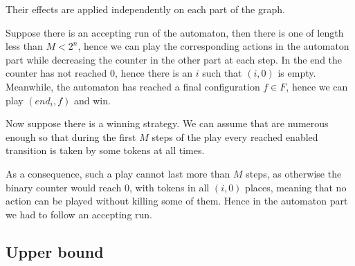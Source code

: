 \documentclass{article}
\begin{document}
Their effects are applied independently on each part of the graph.

Suppose there is an accepting run of the automaton, then there is one of length less than $M < 2^n$, hence we can play the corresponding actions in the automaton part while decreasing the counter in the other part at each step.
In the end the counter has not reached $0$, hence there is an $i$ such that $(i,0)$ is empty. Meanwhile, the automaton has reached a final configuration $f \in F$, hence we can play $(end_i, f)$ and win.

Now suppose there is a winning strategy. We can assume that are numerous enough so that during the first $M$ steps of the play every reached enabled transition is taken by some tokens at all times.

As a consequence, such a play cannot last more than $M$ steps, as otherwise the binary counter would reach $0$, with tokens in all $(i,0)$ places, meaning that no action can be played without killing some of them.
Hence in the automaton part we had to follow an accepting run.

\subsection{Upper bound}


  
\printbibliography
\end{document}
